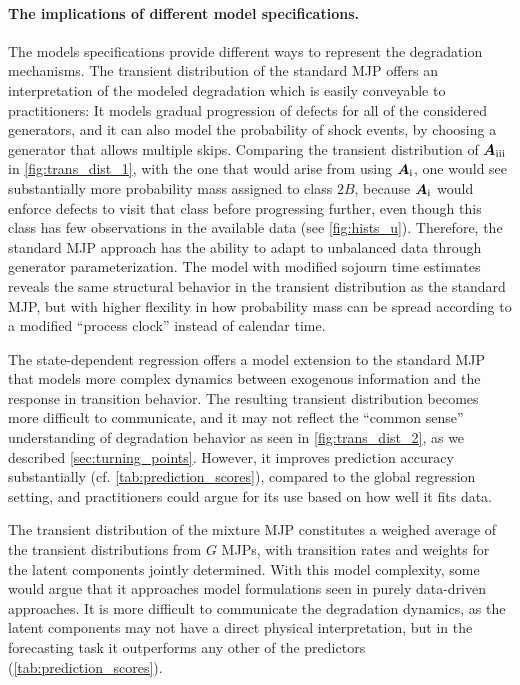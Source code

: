 \documentclass{article}
\newcommand{\RN}[1]{\textup{\uppercase\expandafter{\romannumeral#1}}}
\begin{document}
\paragraph{The implications of different model specifications.}
The models specifications provide different ways to represent the degradation mechanisms. The transient distribution of the standard MJP offers an interpretation of the modeled degradation which is easily conveyable to practitioners: 
It models gradual progression of defects for all of the considered generators,
and it can also model the probability of shock events, by choosing a generator that allows multiple skips.
Comparing the transient distribution of $\bm{A}_{\RN{3}}$ in \cref{fig:trans_dist_1}, with the one that would arise from using $\bm{A}_{\RN{1}}$, one would see substantially more probability mass assigned to class $2B$, because $\bm{A}_{\RN{1}}$ would enforce defects to visit that class before progressing further, even though this class has few observations in the available data (see \cref{fig:hists_u}). Therefore, the standard MJP approach has the ability to adapt to unbalanced data through generator parameterization. 
The model with modified sojourn time estimates reveals the same structural behavior in the transient distribution as the standard MJP, but with higher flexility in how probability mass can be spread according to a modified ``process clock'' instead of calendar time.

The state-dependent regression offers a model extension to the standard MJP that models more complex dynamics between exogenous information and the response in transition behavior. The resulting transient distribution becomes more difficult to communicate, and it may not reflect the ``common sense'' understanding of degradation behavior as seen in \cref{fig:trans_dist_2}, as we described \cref{sec:turning_points}. However, it improves prediction accuracy substantially (cf. \cref{tab:prediction_scores}), compared to the global regression setting, and practitioners could argue for its use based on how well it fits data.

The transient distribution of the mixture MJP constitutes a weighed average of the transient distributions from $G$ MJPs, with transition rates and weights for the latent components jointly determined. With this model complexity, some would argue that it approaches model formulations seen in purely data-driven approaches. It is more difficult to communicate the degradation dynamics, as the latent components may not have a direct physical interpretation, but in the forecasting task it outperforms any other of the predictors (\cref{tab:prediction_scores}).
\end{document}

